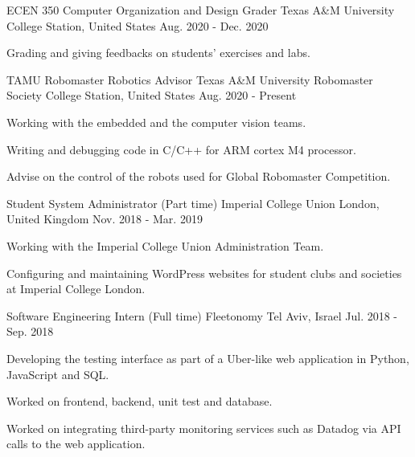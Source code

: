 
\begin{cventries}
  \cventry
    {ECEN 350 Computer Organization and Design Grader} %
    {Texas A\&M University} %
    {College Station, United States} %
    {Aug. 2020 - Dec. 2020} %
    {
      \begin{cvitems} %
        \item {Grading and giving feedbacks on students' exercises and labs.}
      \end{cvitems}
    }
    
  \cventry
    {TAMU Robomaster Robotics Advisor} %
    {Texas A\&M University Robomaster Society} %
    {College Station, United States} %
    {Aug. 2020 - Present} %
    {
      \begin{cvitems} %
        \item {Working with the embedded and the computer vision teams.}
        \item {Writing and debugging code in C/C++ for ARM cortex M4 processor.}
        \item {Advise on the control of the robots used for Global Robomaster Competition.}
      \end{cvitems}
    }

  \cventry
    {Student System Administrator (Part time)} %
    {Imperial College Union} %
    {London, United Kingdom} %
    {Nov. 2018 - Mar. 2019} %
    {
      \begin{cvitems} %
        \item {Working with the Imperial College Union Administration Team.}
        \item {Configuring and maintaining WordPress websites for student clubs and societies at Imperial College London.}
      \end{cvitems}
    }

  \cventry
    {Software Engineering Intern (Full time)} %
    {Fleetonomy} %
    {Tel Aviv, Israel} %
    {Jul. 2018 - Sep. 2018} %
    {
      \begin{cvitems} %
        \item {Developing the testing interface as part of a Uber-like web application in Python, JavaScript and SQL.}
        \item {Worked on frontend, backend, unit test and database.}
        \item {Worked on integrating third-party monitoring services such as Datadog via API calls to the web application.}
      \end{cvitems}
    }
    

\end{cventries}
